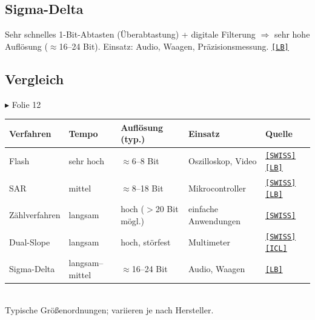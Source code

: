 \documentclass[11pt,a4paper]{article}
\newcommand{\q}[1]{\hyperlink{src:#1}{\textcolor{quelle}{\texttt{\footnotesize[#1]}}}}
\newcommand{\folie}[1]{\textcolor{akzent}{\footnotesize\textsf{$\blacktriangleright$ Folie #1}}}
\begin{document}
\subsection{Sigma-Delta}
Sehr schnelles 1-Bit-Abtasten (Überabtastung) + digitale Filterung $\Rightarrow$ sehr hohe Auflösung ($\approx$16--24 Bit). Einsatz: Audio, Waagen, Präzisionsmessung. \q{LB}

\subsection{Vergleich}\label{sec:vergleich}
\folie{12}\\[1mm]
\begin{tabularx}{\textwidth}{@{}lllXl@{}}
\toprule
Verfahren & Tempo & Auflösung (typ.) & Einsatz & Quelle\\ \midrule
Flash & sehr hoch & $\approx$6--8 Bit & Oszilloskop, Video & \q{SWISS}\,\q{LB}\\
SAR & mittel & $\approx$8--18 Bit & Mikrocontroller & \q{SWISS}\,\q{LB}\\
Zählverfahren & langsam & hoch ($>$20 Bit mögl.) & einfache Anwendungen & \q{SWISS}\\
Dual-Slope & langsam & hoch, störfest & Multimeter & \q{SWISS}\,\q{ICL}\\
Sigma-Delta & langsam--mittel & $\approx$16--24 Bit & Audio, Waagen & \q{LB}\\
\bottomrule
\end{tabularx}\\[1mm]
{\footnotesize Typische Größenordnungen; variieren je nach Hersteller.}

\end{document}
